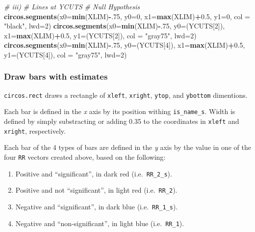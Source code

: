 \documentclass[
]{article}
\newenvironment{Shaded}{\begin{snugshade}}{\end{snugshade}}
\newcommand{\CommentTok}[1]{\textcolor[rgb]{0.56,0.35,0.01}{\textit{#1}}}
\newcommand{\DataTypeTok}[1]{\textcolor[rgb]{0.13,0.29,0.53}{#1}}
\newcommand{\DecValTok}[1]{\textcolor[rgb]{0.00,0.00,0.81}{#1}}
\newcommand{\FloatTok}[1]{\textcolor[rgb]{0.00,0.00,0.81}{#1}}
\newcommand{\KeywordTok}[1]{\textcolor[rgb]{0.13,0.29,0.53}{\textbf{#1}}}
\newcommand{\NormalTok}[1]{#1}
\newcommand{\OperatorTok}[1]{\textcolor[rgb]{0.81,0.36,0.00}{\textbf{#1}}}
\newcommand{\StringTok}[1]{\textcolor[rgb]{0.31,0.60,0.02}{#1}}
\providecommand{\tightlist}{%
  \setlength{\itemsep}{0pt}\setlength{\parskip}{0pt}}
\begin{document}
\begin{Shaded}
\begin{Highlighting}[]
\CommentTok{# iii)}
\CommentTok{# Lines at YCUTS}
\CommentTok{# Null Hypothesis}
\KeywordTok{circos.segments}\NormalTok{(}\DataTypeTok{x0=}\KeywordTok{min}\NormalTok{(XLIM)}\OperatorTok{-}\NormalTok{.}\DecValTok{75}\NormalTok{, }\DataTypeTok{y0=}\DecValTok{0}\NormalTok{, }\DataTypeTok{x1=}\KeywordTok{max}\NormalTok{(XLIM)}\OperatorTok{+}\FloatTok{0.5}\NormalTok{, }\DataTypeTok{y1=}\DecValTok{0}\NormalTok{, }\DataTypeTok{col =} \StringTok{"black"}\NormalTok{, }\DataTypeTok{lwd=}\DecValTok{2}\NormalTok{)}
\KeywordTok{circos.segments}\NormalTok{(}\DataTypeTok{x0=}\KeywordTok{min}\NormalTok{(XLIM)}\OperatorTok{-}\NormalTok{.}\DecValTok{75}\NormalTok{, }\DataTypeTok{y0=}\NormalTok{(YCUTS[}\DecValTok{2}\NormalTok{]), }\DataTypeTok{x1=}\KeywordTok{max}\NormalTok{(XLIM)}\OperatorTok{+}\FloatTok{0.5}\NormalTok{, }\DataTypeTok{y1=}\NormalTok{(YCUTS[}\DecValTok{2}\NormalTok{]), }\DataTypeTok{col =} \StringTok{"gray75"}\NormalTok{, }\DataTypeTok{lwd=}\DecValTok{2}\NormalTok{)}
\KeywordTok{circos.segments}\NormalTok{(}\DataTypeTok{x0=}\KeywordTok{min}\NormalTok{(XLIM)}\OperatorTok{-}\NormalTok{.}\DecValTok{75}\NormalTok{, }\DataTypeTok{y0=}\NormalTok{(YCUTS[}\DecValTok{4}\NormalTok{]), }\DataTypeTok{x1=}\KeywordTok{max}\NormalTok{(XLIM)}\OperatorTok{+}\FloatTok{0.5}\NormalTok{, }\DataTypeTok{y1=}\NormalTok{(YCUTS[}\DecValTok{4}\NormalTok{]), }\DataTypeTok{col =} \StringTok{"gray75"}\NormalTok{, }\DataTypeTok{lwd=}\DecValTok{2}\NormalTok{)}
\end{Highlighting}
\end{Shaded}

\hypertarget{draw-bars-with-estimates}{%
\subsubsection{Draw bars with
estimates}\label{draw-bars-with-estimates}}

\texttt{circos.rect} draws a rectangle of \texttt{xleft},
\texttt{xright}, \texttt{ytop}, and \texttt{ybottom} dimentions.

Each bar is defined in the \emph{x} axis by its position withing
\texttt{is\_name\_s}. Width is defined by simply substracting or adding
0.35 to the coordinates in \texttt{xleft} and \texttt{xright},
respectively.

Each bar of the 4 types of bars are defined in the \emph{y} axis by the
value in one of the four \texttt{RR} vectors created above, based on the
following:

\begin{enumerate}
\def\labelenumi{\arabic{enumi}.}
\tightlist
\item
  Positive and ``significant'', in dark red (i.e.~\texttt{RR\_2\_s}).\\
\item
  Positive and not ``significant'', in light red
  (i.e.~\texttt{RR\_2}).\\
\item
  Negative and ``significant'', in dark blue (i.e.~\texttt{RR\_1\_s}).\\
\item
  Negative and ``non-significant'', in light blue (i.e.~\texttt{RR\_1}).
\end{enumerate}
\end{document}

